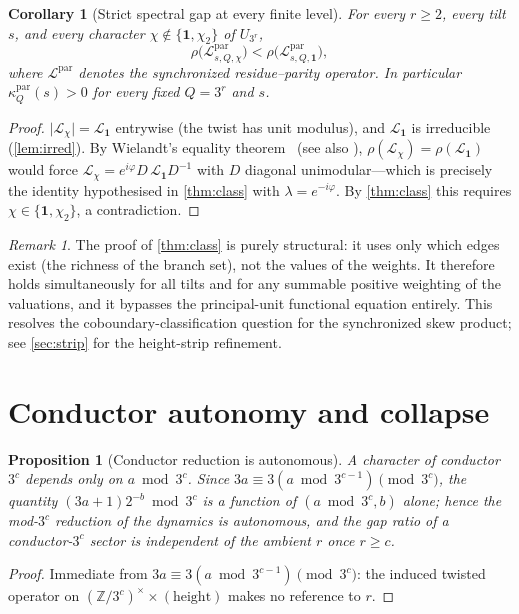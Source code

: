 \documentclass[11pt]{article}
\newcommand{\Z}{\mathbb{Z}}
\newcommand{\Lcal}{\mathcal{L}}
\newcommand{\UQ}{U_{3^r}}
\theoremstyle{plain}
\newtheorem{proposition}{Proposition}
\newtheorem{corollary}{Corollary}
\theoremstyle{definition}
\theoremstyle{remark}
\newtheorem*{remark}{Remark}
\begin{document}
\begin{corollary}[Strict spectral gap at every finite level]\label{cor:strict}
For every $r\ge2$, every tilt $s$, and every character
$\chi\notin\{\mathbf1,\chi_2\}$ of $\UQ$,
\[
\rho\bigl(\Lcal^{\mathrm{par}}_{s,Q,\chi}\bigr)<\rho\bigl(\Lcal^{\mathrm{par}}_{s,Q,\mathbf1}\bigr),
\]
where $\Lcal^{\mathrm{par}}$ denotes the synchronized residue--parity operator. In
particular $\kappa^{\mathrm{par}}_Q(s)>0$ for every fixed $Q=3^r$ and $s$.
\end{corollary}
\begin{proof}
$\lvert\Lcal_{\chi}\rvert=\Lcal_{\mathbf1}$ entrywise (the twist has unit
modulus), and $\Lcal_{\mathbf1}$ is irreducible (\cref{lem:irred}). By Wielandt's
equality theorem~\cite{wielandt1950} (see also
\cite[Theorem~8.4.5]{hornjohnson}), $\rho(\Lcal_\chi)=\rho(\Lcal_{\mathbf1})$ would force
$\Lcal_\chi=e^{i\varphi}D\,\Lcal_{\mathbf1}D^{-1}$ with $D$ diagonal
unimodular---which is precisely the identity hypothesised in \cref{thm:class}
with $\lambda=e^{-i\varphi}$. By \cref{thm:class} this requires
$\chi\in\{\mathbf1,\chi_2\}$, a contradiction.
\end{proof}

\begin{remark}
The proof of \cref{thm:class} is purely structural: it uses only which edges
exist (the richness of the branch set), not the values of the weights. It
therefore holds simultaneously for all tilts and for any summable positive
weighting of the valuations, and it bypasses the principal-unit functional
equation entirely. This resolves the coboundary-classification question for the
synchronized skew product; see \cref{sec:strip} for the height-strip refinement.
\end{remark}

\section{Conductor autonomy and collapse}

\begin{proposition}[Conductor reduction is autonomous]\label{prop:cond}
A character of conductor $3^c$ depends only on $a\bmod3^c$. Since
$3a\equiv3(a\bmod3^{c-1})\pmod{3^c}$, the quantity $(3a+1)2^{-b}\bmod3^c$ is a
function of $(a\bmod3^c,b)$ alone; hence the mod-$3^c$ reduction of the dynamics
is autonomous, and the gap ratio of a conductor-$3^c$ sector is \emph{independent
of the ambient $r$} once $r\ge c$.
\end{proposition}
\begin{proof}
Immediate from $3a\equiv3(a\bmod3^{c-1})\pmod{3^c}$: the induced twisted operator
on $(\Z/3^c)^\times\times(\text{height})$ makes no reference to $r$.
\end{proof}
\end{document}
